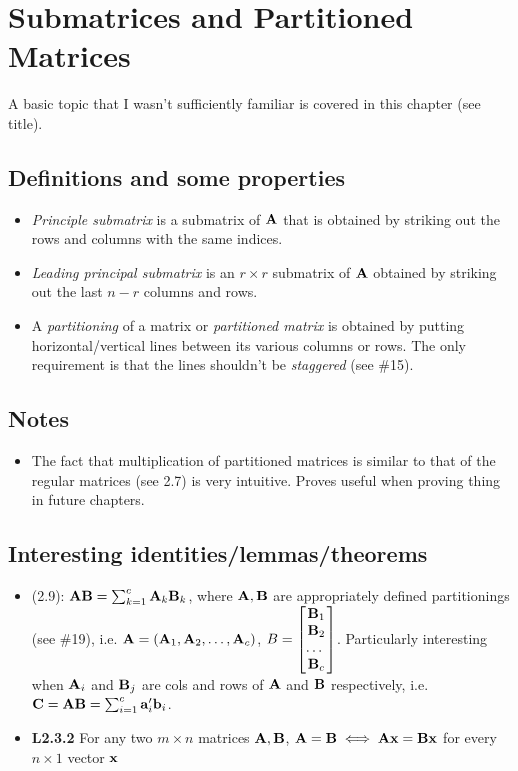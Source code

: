 \documentclass[a4paper, oneside]{book}
\begin{document}
\chapter{Submatrices and Partitioned Matrices}
A basic topic that I wasn't sufficiently familiar is covered in this chapter (see title). 

\section{Definitions and some properties}
\begin{itemize}
\item \textit{Principle submatrix} is a submatrix of $\mathbf A$ that is obtained by striking out the rows and columns with the same indices.
\item \textit{Leading principal submatrix} is an $r\times r$ submatrix of $\mathbf A$ obtained by striking out the last $n-r$ columns and rows.
\item A \textit{partitioning} of a matrix or \textit{partitioned matrix} is obtained by putting horizontal/vertical lines between its various columns or rows. The only requirement is that the lines shouldn't be \textit{staggered} (see \#15). 
\end{itemize}

\section*{Notes}
\begin{itemize}
\item The fact that multiplication of partitioned matrices is similar to that of the regular matrices (see 2.7) is very intuitive. Proves useful when proving thing in future chapters.
\end{itemize}

\section*{Interesting identities/lemmas/theorems}

\begin{itemize}
\item (2.9): $\mathbf{AB} = \sum_{k=1}^c \mathbf{A}_k \mathbf{B}_k$, where $\mathbf{A,B}$ are appropriately defined partitionings (see \#19), i.e. $\mathbf{A} = \left(\mathbf{A}_1, \mathbf{A}_2, \hdots, \mathbf{A}_c \right)$, $B=\begin{bmatrix} \mathbf{B}_1\\ \mathbf{B}_2\\ \hdots\ \\ \mathbf{B}_c \end{bmatrix}$. Particularly interesting when $\mathbf{A}_i$ and $\mathbf{B}_j$ are cols and rows of $\mathbf A$ and $\mathbf B$ respectively, i.e. $\mathbf{C}=\mathbf{A}\mathbf{B}=\sum_{i=1}^c \mathbf{a}'_i\mathbf{b}_i$.
\item \textbf{L2.3.2} For any two $m\times n$ matrices $ \mathbf{A,B}$, $\mathbf A = \mathbf B \iff \mathbf{Ax = Bx}$ for every $n\times 1$ vector $\mathbf x$
\end{itemize}
\end{document}
